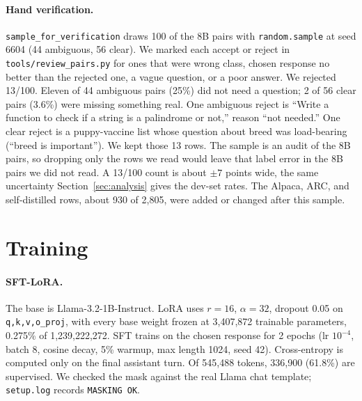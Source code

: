 \documentclass[11pt]{article}
\begin{document}
\paragraph{Hand verification.}
\texttt{sample\_for\_verification} draws 100 of the 8B pairs with \texttt{random.sample} at seed 6604 (44 ambiguous, 56 clear).
We marked each accept or reject in \texttt{tools/review\_pairs.py} for ones that were wrong class, chosen response no better than the rejected one, a vague question, or a poor answer.
We rejected 13/100.
Eleven of 44 ambiguous pairs (25\%) did not need a question; 2 of 56 clear pairs (3.6\%) were missing something real.
One ambiguous reject is ``Write a function to check if a string is a palindrome or not,'' reason ``not needed.''
One clear reject is a puppy-vaccine list whose question about breed was load-bearing (``breed is important'').
We kept those 13 rows. The sample is an audit of the 8B pairs, so dropping only the rows we read would leave that label error in the 8B pairs we did not read. A 13/100 count is about $\pm 7$ points wide, the same uncertainty Section~\ref{sec:analysis} gives the dev-set rates. The Alpaca, ARC, and self-distilled rows, about 930 of 2,805, were added or changed after this sample.

\section{Training}
\label{sec:training}

\paragraph{SFT-LoRA.}
The base is Llama-3.2-1B-Instruct.
LoRA uses $r{=}16$, $\alpha{=}32$, dropout 0.05 on \texttt{q,k,v,o\_proj}, with every base weight frozen at 3,407,872 trainable parameters, 0.275\% of 1,239,222,272.
SFT trains on the chosen response for 2 epochs (lr $10^{-4}$, batch 8, cosine decay, 5\% warmup, max length 1024, seed 42).
Cross-entropy is computed only on the final assistant turn.
Of 545,488 tokens, 336,900 (61.8\%) are supervised.
We checked the mask against the real Llama chat template; \texttt{setup.log} records \texttt{MASKING OK}.
\end{document}

